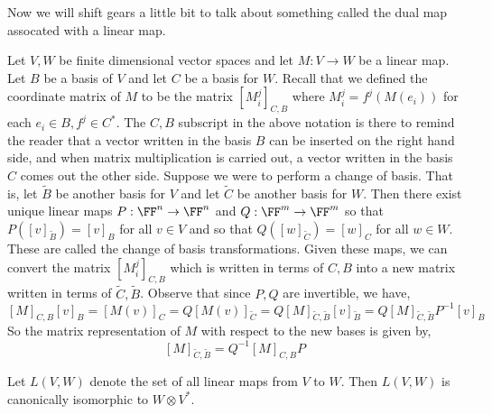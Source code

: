 Now we will shift gears a little bit to talk about something called the dual map assocated with a linear map.

Let $V,W$ be finite dimensional vector spaces and let $M : V\to W$ be a linear map. Let $B$ be a basis of $V$ and let $C$ be a basis for $W$. Recall that we defined the coordinate matrix of $M$ to be the matrix $[M_i^j]_{C,B}$ where $M_i^j = f^j(M(e_i))$ for each $e_i\in B, f^j \in C^*$. The $C,B$ subscript in the above notation is there to remind the reader that a vector written in the basis $B$ can be inserted on the right hand side, and when matrix multiplication is carried out, a vector written in the basis $C$ comes out the other side. Suppose we were to perform a change of basis. That is, let $\tilde{B}$ be another basis for $V$ and let $\tilde{C}$ be another basis for $W$. Then there exist unique linear maps $P : \FF^n\to \FF^n$ and $Q : \FF^m\to \FF^m$ so that $P([v]_{\tilde{B}}) = [v]_{B}$ for all $v \in V$ and so that $Q([w]_{\tilde{C}})=[w]_{C}$ for all $w \in W$. These are called the change of basis transformations. Given these maps, we can convert the matrix $[M_i^j]_{C,B}$ which is written in terms of $C,B$ into a new matrix written in terms of $\tilde{C},\tilde{B}$. Observe that since $P,Q$ are invertible, we have,
\[[M]_{C,B}[v]_B = [M(v)]_C = Q[M(v)]_{\tilde{C}} = Q[M]_{\tilde{C},\tilde{B}} [v]_{\tilde{B}} = Q[M]_{\tilde{C},\tilde{B}}P^{-1}[v]_{B}\]
So the matrix representation of $M$ with respect to the new bases is given by, \[[M]_{\tilde{C},\tilde{B}} = Q^{-1} [M]_{C,B}P\]
\begin{thm}
    Let $L(V,W)$ denote the set of all linear maps from $V$ to $W$. Then $L(V,W)$ is canonically isomorphic to $W\otimes V^*$.
\end{thm}
